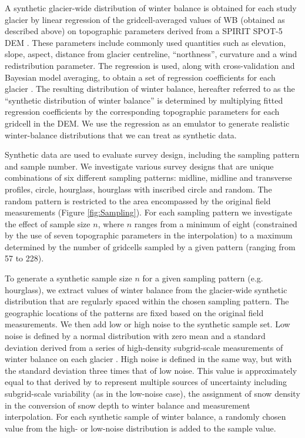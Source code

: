 \documentclass[twocolumn,letterpaper]{igs}
\begin{document}
A synthetic glacier-wide distribution of winter balance is obtained for each study glacier by linear regression of the gridcell-averaged values of WB (obtained as described above) on topographic parameters derived from a SPIRIT SPOT-5 DEM \citep{Korona2009}. These parameters include commonly used quantities \citep[e.g.][]{McGrath2015} such as elevation, slope, aspect, distance from glacier centreline, ``northness'', curvature and a wind redistribution parameter. The regression is used, along with cross-validation and Bayesian model averaging, to obtain a set of regression coefficients for each glacier  \citep{Pulwicki2017}. The resulting distribution of winter balance, hereafter referred to as the ``synthetic distribution of winter balance'' is determined by multiplying fitted regression coefficients by the corresponding topographic parameters for each gridcell in the DEM. We use the regression as an emulator to generate realistic winter-balance distributions that we can treat as synthetic data. 

Synthetic data are used to evaluate survey design, including the sampling pattern and sample number. 
We investigate various survey designs that are unique combinations of six different sampling patterns: midline, midline and transverse profiles, circle, hourglass, hourglass with inscribed circle and random. The random pattern is restricted to the area encompassed by the original field measurements (Figure \ref{fig:Sampling}). 
For each sampling pattern we investigate the effect of sample size $n$, where $n$ ranges from a minimum of eight (constrained by the use of seven topographic parameters in the interpolation) to a maximum determined by the number of gridcells sampled by a given pattern (ranging from 57 to 228). 

To generate a synthetic sample size $n$ for a given sampling pattern (e.g. hourglass), we extract values of winter balance from the glacier-wide synthetic distribution 
that are regularly spaced within the chosen sampling pattern. The geographic locations of the patterns are fixed based on the original field measurements.    
We then add low or high noise to the synthetic sample set. Low noise is defined by a normal distribution with zero mean and a standard deviation derived from a series of high-density subgrid-scale measurements of winter balance on each glacier \citep{Pulwicki2017}.  
High noise is defined in the same way, but with the standard deviation three times that of low noise. This value is approximately equal to that derived by \citet{Pulwicki2017} to represent multiple sources of uncertainty including subgrid-scale variability (as in the low-noise case), the assignment of snow density in the conversion of snow depth to winter balance and measurement interpolation.
For each synthetic sample of winter balance, a randomly chosen value from the high- or low-noise distribution is added to the sample value.
\end{document}

